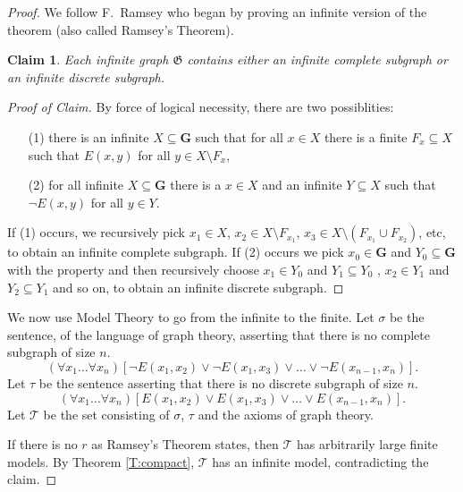 \documentclass[titlepage, oneside]{amsbook}
\theoremstyle{plain}
\newtheorem*{claim}{Claim}
\theoremstyle{definition}
\theoremstyle{remark}
\newcommand{\tee}{\ensuremath{\mathcal{T}}}
\newcommand{\seq}{\ensuremath{\subseteq}}
\newcommand{\mg}{\ensuremath{\mathfrak{G}}}
\newcommand{\bg}{\ensuremath{\mathbf{G}}}
\newcommand{\frx}[2][0]{\ensuremath{\forall x_{#1}  \dots  \forall
x_{#2}}}
\begin{document}
\begin{proof}  We follow F.~Ramsey who began by proving an infinite
version of the theorem (also called Ramsey's Theorem).

\begin{claim}  Each infinite graph $\mg$  contains either an infinite
complete
subgraph or an infinite discrete subgraph.

\end{claim}

\begin{proof}[Proof of Claim]  By force of logical necessity, there are
two possiblities: 
\begin{itemize}
\item[(1)] there is an infinite $X \seq \bg$ such that for all $x \in
X$
there
is a finite $F_x \seq X$ such that $E(x, y)$ for all $y \in X \setminus
F_x$,
\item[(2)] for all infinite $X \seq \bg$ there is a $x \in X$ and an
infinite
$Y \seq X$ such that $\neg E ( x, y )$ for all $y \in Y$.
\end{itemize}

If (1) occurs, we recursively pick $x_1 \in X$, $x_2 \in X \setminus
F_{x_1}$, $x_3 \in X \setminus ( F_{x_1} \cup F_{x_2})$, etc, to obtain
an infinite complete subgraph.  If (2) occurs we pick $x_0 \in \bg$ and
$Y_0 \seq \bg$ with the property and then recursively choose $x_1 \in
Y_0$ and $Y_1 \seq Y_0$ , $x_2 \in Y_1$ and $Y_2 \seq Y_1$ and so on,
to obtain an infinite discrete subgraph.

\renewcommand{\qedsymbol}{}
\end{proof}

We now use Model Theory to go from the infinite to the finite.  Let
$\sigma$ be the sentence,  of the language of graph theory, asserting
that there is no complete subgraph of size $n$.
\[ (\frx[1]{n})[\neg E(x_1, x_2) \vee \neg E(x_1 , x_3 ) \vee \dots
\vee \neg E(x_{n-1}, x_n) ] . \]
Let $\tau$ be the sentence asserting that there is no discrete subgraph
of size $n$. \[ (\frx[1]{n})[ E(x_1, x_2) \vee  E(x_1 , x_3 )
\vee \dots \vee E(x_{n-1}, x_n) ] . \]
Let $\tee$ be the set consisting of $\sigma$, $\tau$ and the axioms of
graph theory.  


If there is no $r$ as Ramsey's Theorem states, then $\tee$ has
arbitrarily large finite models.  By Theorem \ref{T:compact}, $\tee$
has an infinite model, contradicting the claim.

\end{proof}
\end{document}
